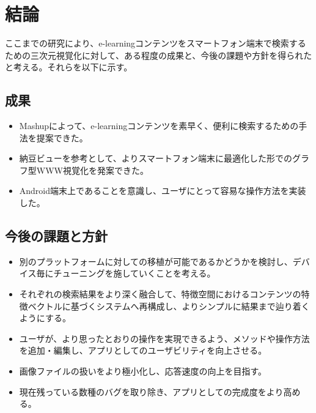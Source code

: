 \chapter{結論}
\label{chap:conclusion}

ここまでの研究により、e-learningコンテンツをスマートフォン端末で検索するための三次元視覚化に対して、ある程度の成果と、今後の課題や方針を得られたと考える。それらを以下に示す。

\section{成果}
\begin{itemize}
\item Mashupによって、e-learningコンテンツを素早く、便利に検索するための手法を提案できた。
\item 納豆ビューを参考として、よりスマートフォン端末に最適化した形でのグラフ型WWW視覚化を発案できた。
\item Android端末上であることを意識し、ユーザにとって容易な操作方法を実装した。
\end{itemize}

\section{今後の課題と方針}
\begin{itemize}
\item 別のプラットフォームに対しての移植が可能であるかどうかを検討し、デバイス毎にチューニングを施していくことを考える。
\item それぞれの検索結果をより深く融合して、特徴空間におけるコンテンツの特徴ベクトルに基づくシステムへ再構成し、よりシンプルに結果まで辿り着くようにする。
\item ユーザが、より思ったとおりの操作を実現できるよう、メソッドや操作方法を追加・編集し、アプリとしてのユーザビリティを向上させる。
\item 画像ファイルの扱いをより極小化し、応答速度の向上を目指す。
\item 現在残っている数種のバグを取り除き、アプリとしての完成度をより高める。
\end{itemize}
